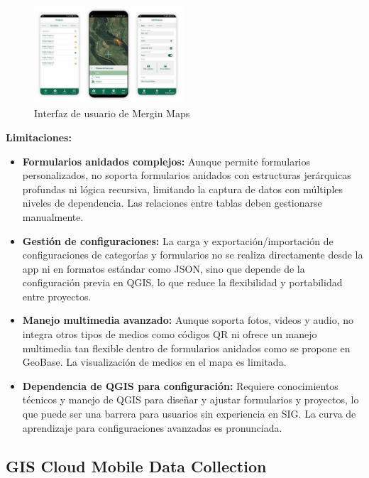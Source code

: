 \documentclass[12pt, a4paper]{book}
\begin{document}
\begin{figure}[h]
  \centering
  \includegraphics[width=0.5\textwidth]{images/mergin.jpeg}
  \caption{Interfaz de usuario de Mergin Maps}
  \label{fig:merginform}
\end{figure}

\textbf{Limitaciones:}
\begin{itemize}
  \item \textbf{Formularios anidados complejos:} Aunque permite formularios personalizados, no soporta formularios anidados con estructuras jerárquicas profundas ni lógica recursiva, limitando la captura de datos con múltiples niveles de dependencia. Las relaciones entre tablas deben gestionarse manualmente.
  
  \item \textbf{Gestión de configuraciones:} La carga y exportación/importación de configuraciones de categorías y formularios no se realiza directamente desde la app ni en formatos estándar como JSON, sino que depende de la configuración previa en QGIS, lo que reduce la flexibilidad y portabilidad entre proyectos.
  
  \item \textbf{Manejo multimedia avanzado:} Aunque soporta fotos, videos y audio, no integra otros tipos de medios como códigos QR ni ofrece un manejo multimedia tan flexible dentro de formularios anidados como se propone en GeoBase. La visualización de medios en el mapa es limitada.
  
  \item \textbf{Dependencia de QGIS para configuración:} Requiere conocimientos técnicos y manejo de QGIS para diseñar y ajustar formularios y proyectos, lo que puede ser una barrera para usuarios sin experiencia en SIG. La curva de aprendizaje para configuraciones avanzadas es pronunciada.
\end{itemize}

\subsection{GIS Cloud Mobile Data Collection}
\end{document}
